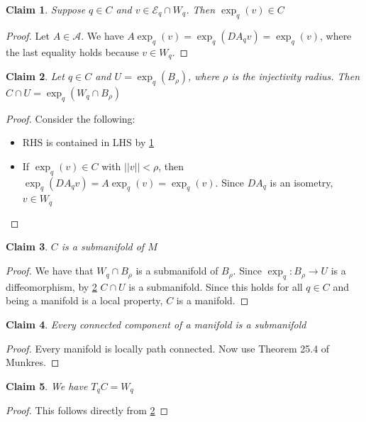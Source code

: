 \documentclass[a4paper,11pt]{article}
\newtheorem{claim}{Claim}
\begin{document}
\begin{claim}\label{WtoC}
  Suppose $q \in C$ and $v \in \mathcal{E}_q \cap W_q$. Then $\exp_q(v) \in C$
\end{claim}

\begin{proof}
  Let $A \in \mathcal{A}$. We have $A\exp_q(v)=\exp_q(DA_qv)=\exp_q(v)$, where the last equality holds because $v \in W_q$.
\end{proof}

\begin{claim}\label{CWrelation}
  Let $q \in C$ and $U=\exp_q(B_\rho)$, where $\rho$ is the injectivity radius. Then $C \cap U = \exp_q(W_q \cap B_\rho)$
\end{claim}

\begin{proof}
  Consider the following:
  \begin{itemize}
    \item RHS is contained in LHS by \ref{WtoC}
    \item If $\exp_q(v) \in C$ with $||v||<\rho$, then $\exp_q(DA_qv)=A\exp_q(v)=\exp_q(v)$. Since $DA_q$ is an isometry, $v \in W_q$
  \end{itemize}
\end{proof}

\begin{claim}
  $C$ is a submanifold of $M$
\end{claim}

\begin{proof}
  We have that $W_q \cap B_\rho$ is a submanifold of $B_\rho$.
  Since $\exp_q:B_\rho \to U$ is a diffeomorphism, by \ref{CWrelation} $C \cap U$ is a submanifold. 
  Since this holds for all $q \in C$ and being a manifold is a local property, $C$ is a manifold.
\end{proof}

\begin{claim}
  Every connected component of a manifold is a submanifold
\end{claim}

\begin{proof}
  Every manifold is locally path connected. Now use Theorem 25.4 of Munkres.
\end{proof}

\begin{claim}\label{CtangentSpace}
  We have $T_qC=W_q$
\end{claim}

\begin{proof}
  This follows directly from \ref{CWrelation}
\end{proof}
\end{document}
